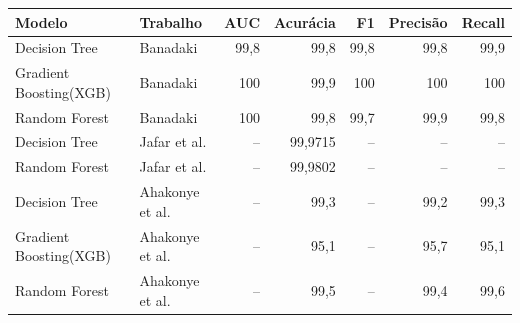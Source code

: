 \begin{tabular}{llrrrrr}
\hline
\textbf{Modelo} & \textbf{Trabalho} & \textbf{AUC} & \textbf{Acurácia} & \textbf{F1} & \textbf{Precisão} & \textbf{Recall} \\ \hline
Decision Tree & Banadaki & 99,8 & 99,8 & 99,8 & 99,8 & 99,9 \\
Gradient Boosting(XGB) & Banadaki & 100 & 99,9 & 100 & 100 & 100 \\
Random Forest & Banadaki & 100 & 99,8 & 99,7 & 99,9 & 99,8 \\
Decision Tree & Jafar et al. & -- & 99,9715 & -- & -- & -- \\
Random Forest & Jafar et al. & -- & 99,9802 & -- & -- & -- \\
Decision Tree & Ahakonye et al. & -- & 99,3 & -- & 99,2 & 99,3 \\
Gradient Boosting(XGB) & Ahakonye et al. & -- & 95,1 & -- & 95,7 & 95,1 \\
Random Forest & Ahakonye et al. & -- & 99,5 & -- & 99,4 & 99,6 \\
\hline
\end{tabular}
